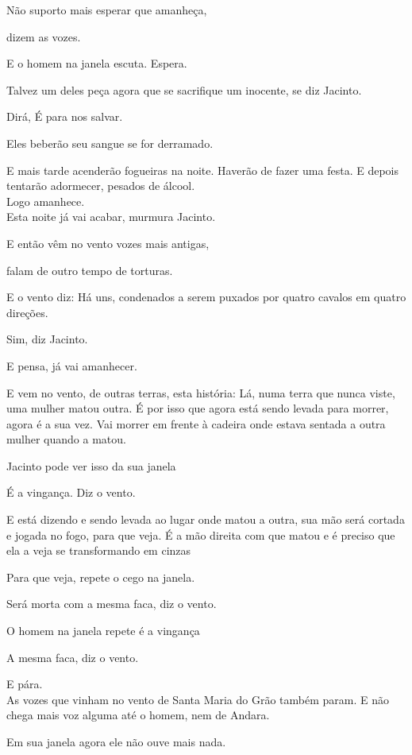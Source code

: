 Não suporto mais esperar que amanheça,

dizem as vozes.

E o homem na janela escuta. Espera.

Talvez um deles peça agora que se sacrifique um inocente, se diz
Jacinto.

Dirá, É para nos salvar.

Eles beberão seu sangue se for derramado.

E mais tarde acenderão fogueiras na noite. Haverão de fazer uma festa. E
depois tentarão adormecer, pesados de álcool.\\

Logo amanhece.\\

Esta noite já vai acabar, murmura Jacinto.

E então vêm no vento vozes mais antigas,

falam de outro tempo de torturas.

E o vento diz: Há uns, condenados a serem puxados por quatro cavalos em
quatro direções.

Sim, diz Jacinto.

E pensa, já vai amanhecer.

E vem no vento, de outras terras, esta história: Lá, numa terra que
nunca viste, uma mulher matou outra. É por isso que agora está sendo
levada para morrer, agora é a sua vez. Vai morrer em frente à cadeira
onde estava sentada a outra mulher quando a matou.

Jacinto pode ver isso da sua janela

É a vingança. Diz o vento.

E está dizendo e sendo levada ao lugar onde matou a outra, sua mão será
cortada e jogada no fogo, para que veja. É a mão direita com que matou e
é preciso que ela a veja se transformando em cinzas

Para que veja, repete o cego na janela.

Será morta com a mesma faca, diz o vento.

O homem na janela repete é a vingança

A mesma faca, diz o vento.

E pára.\\

As vozes que vinham no vento de Santa Maria do Grão também param. E não
chega mais voz alguma até o homem, nem de Andara.

Em sua janela agora ele não ouve mais nada.

